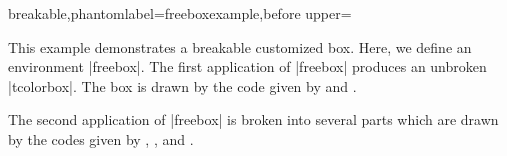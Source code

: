 \begin{dispExample}
\end{dispExample}

\clearpage
\begin{dispListing*}{breakable,phantomlabel=freeboxexample,before upper={This example demonstrates
a breakable customized box. Here, we define an environment |freebox|.
The first application of |freebox| produces an unbroken |tcolorbox|.
The box is drawn by the code given by 
and .\par
The second application of |freebox| is broken into several parts which
are drawn by the codes given by
,
, and
.
\par\bigskip
}}


\end{dispListing*}
